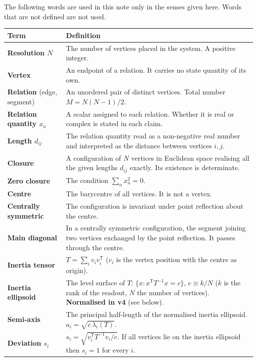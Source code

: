 \documentclass[
  10pt,
]{article}
\newcounter{none} %
\begin{document}
The following words are used in this note only in the senses given here.
Words that are not defined are not used.

{\def\LTcaptype{none} %
\begin{longtable}[]{@{}
  >{\raggedright\arraybackslash}p{}
  >{\raggedright\arraybackslash}p{}@{}}
\toprule\noalign{}
\begin{minipage}[b]{\linewidth}\raggedright
Term
\end{minipage} & \begin{minipage}[b]{\linewidth}\raggedright
Definition
\end{minipage} \\
\midrule\noalign{}
\endhead
\bottomrule\noalign{}
\endlastfoot
\textbf{Resolution \(N\)} & The number of vertices placed in the system.
A positive integer. \\
\textbf{Vertex} & An endpoint of a relation. It carries no state
quantity of its own. \\
\textbf{Relation} (edge, segment) & An unordered pair of distinct
vertices. Total number \(M = N(N-1)/2\). \\
\textbf{Relation quantity \(x_n\)} & A scalar assigned to each relation.
Whether it is real or complex is stated in each claim. \\
\textbf{Length \(d_{ij}\)} & The relation quantity read as a
non-negative real number and interpreted as the distance between
vertices \(i,j\). \\
\textbf{Closure} & A configuration of \(N\) vertices in Euclidean space
realising all the given lengths \(d_{ij}\) exactly. Its existence is
determinate. \\
\textbf{Zero closure} & The condition \(\sum_n x_n^2 = 0\). \\
\textbf{Centre} & The barycentre of all vertices. It is not a vertex. \\
\textbf{Centrally symmetric} & The configuration is invariant under
point reflection about the centre. \\
\textbf{Main diagonal} & In a centrally symmetric configuration, the
segment joining two vertices exchanged by the point reflection. It
passes through the centre. \\
\textbf{Inertia tensor} & \(T = \sum_i v_i v_i^{\mathsf T}\) (\(v_i\) is
the vertex position with the centre as origin). \\
\textbf{Inertia ellipsoid} & The level surface of \(T\):
\(\{x : x^{\mathsf T}T^{-1}x = c\}\), \(c \equiv k/N\) (\(k\) is the
rank of the readout, \(N\) the number of vertices). \textbf{Normalised
in v4} (see below). \\
\textbf{Semi-axis} & The principal half-length of the normalised inertia
ellipsoid. \(a_i = \sqrt{c\,\lambda_i(T)}\). \\
\textbf{Deviation \(s_i\)} &
\(s_i = \sqrt{v_i^{\mathsf T}T^{-1}v_i / c}\). If all vertices lie on
the inertia ellipsoid then \(s_i = 1\) for every \(i\). \\
\end{longtable}
}
\end{document}
